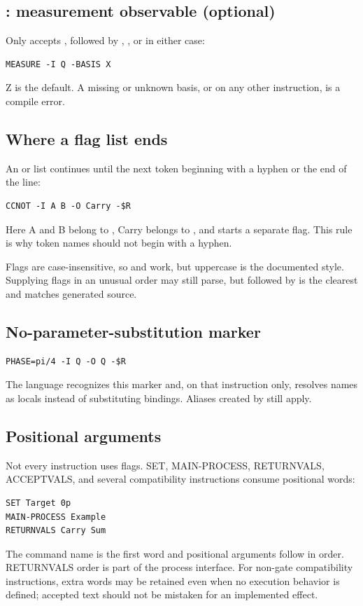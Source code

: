 \subsection{: measurement observable (optional)}

Only  accepts , followed by , , or
 in either case:
\begin{lstlisting}
MEASURE -I Q -BASIS X
\end{lstlisting}
Z is the default. A missing or unknown basis, or  on any other
instruction, is a compile error.

\subsection{Where a flag list ends}

An  or  list continues until the next token beginning with a
hyphen or the end of the line:
\begin{lstlisting}
CCNOT -I A B -O Carry -$R
\end{lstlisting}
Here A and B belong to , Carry belongs to , and
 starts a separate flag. This rule is why token names should not
begin with a hyphen.

Flags are case-insensitive, so  and  work, but uppercase is
the documented style. Supplying flags in an unusual order may still parse, but
 followed by  is the clearest and matches generated source.

\subsection{No-parameter-substitution marker}

\begin{lstlisting}
PHASE=pi/4 -I Q -O Q -$R
\end{lstlisting}
The language recognizes this marker and, on that instruction only, resolves
names as locals instead of substituting  bindings. Aliases created
by  still apply.

\subsection{Positional arguments}

Not every instruction uses flags. SET, MAIN-PROCESS, RETURNVALS, ACCEPTVALS,
and several compatibility instructions consume positional words:
\begin{lstlisting}
SET Target 0p
MAIN-PROCESS Example
RETURNVALS Carry Sum
\end{lstlisting}
The command name is the first word and positional arguments follow in order.
RETURNVALS order is part of the process interface. For non-gate compatibility
instructions, extra words may be retained even when no execution behavior is
defined; accepted text should not be mistaken for an implemented effect.

